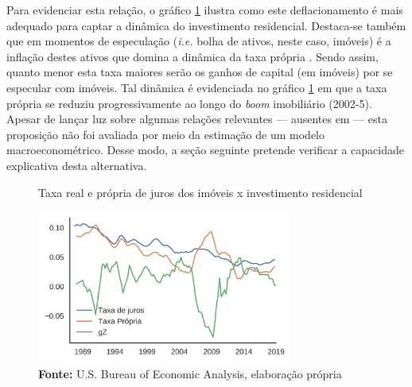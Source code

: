 Para evidenciar esta relação, o gráfico \ref{gZ_Propria} ilustra como  este deflacionamento é mais adequado para captar a dinâmica do investimento residencial.
Destaca-se também que em momentos de especulação (\textit{i.e.} bolha de ativos, neste caso, imóveis) é a inflação destes ativos que domina a dinâmica da taxa própria \cite[p.~53]{teixeira_crescimento_2015}. Sendo assim, quanto menor esta taxa maiores serão os ganhos de capital (em imóveis) por se especular com imóveis.
Tal dinâmica é evidenciada no gráfico \ref{gZ_Propria} em que a taxa própria se reduziu progressivamente ao longo do \textit{boom} imobiliário (2002-5).
Apesar de lançar luz sobre algumas relações relevantes --- ausentes em \textcite{godley_seven_1999} --- esta proposição não foi avaliada por meio da estimação de um modelo macroeconométrico. Desse modo, a seção seguinte pretende verificar a capacidade explicativa desta alternativa.






\begin{figure}[H]
	\centering
	\caption{Taxa real e própria de juros dos imóveis x investimento residencial}
	\label{gZ_Propria}
	\includegraphics[width=0.75\textwidth]{../../Dados/Fatos_Estilizados/figs/TxPropria_Investo.png}
	\caption*{\textbf{Fonte:} U.S. Bureau of Economic Analysis, elaboração própria}
\end{figure}
